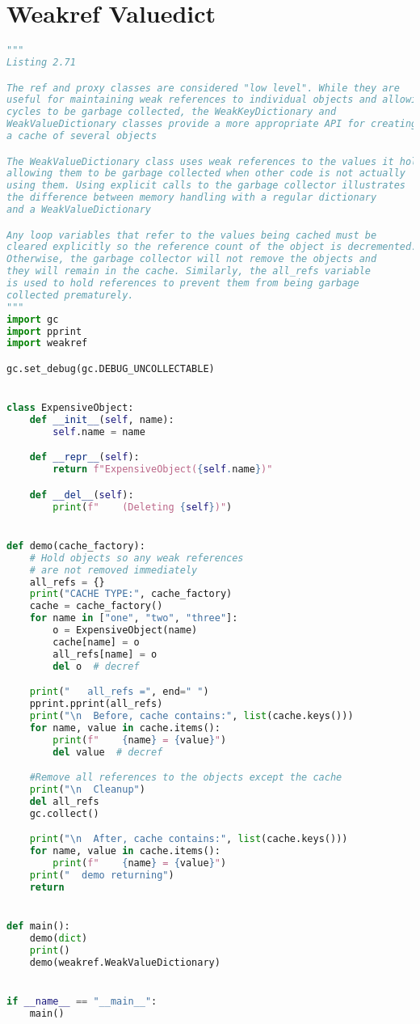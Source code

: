 \documentclass[a4paper,landscape]{report}
\begin{document}
\section{Weakref Valuedict}
\begin{lstlisting}[language=Python]
"""
Listing 2.71

The ref and proxy classes are considered "low level". While they are
useful for maintaining weak references to individual objects and allowing
cycles to be garbage collected, the WeakKeyDictionary and
WeakValueDictionary classes provide a more appropriate API for creating
a cache of several objects

The WeakValueDictionary class uses weak references to the values it holds,
allowing them to be garbage collected when other code is not actually
using them. Using explicit calls to the garbage collector illustrates
the difference between memory handling with a regular dictionary
and a WeakValueDictionary

Any loop variables that refer to the values being cached must be
cleared explicitly so the reference count of the object is decremented.
Otherwise, the garbage collector will not remove the objects and
they will remain in the cache. Similarly, the all_refs variable
is used to hold references to prevent them from being garbage
collected prematurely.
"""
import gc
import pprint
import weakref

gc.set_debug(gc.DEBUG_UNCOLLECTABLE)


class ExpensiveObject:
    def __init__(self, name):
        self.name = name

    def __repr__(self):
        return f"ExpensiveObject({self.name})"

    def __del__(self):
        print(f"    (Deleting {self})")


def demo(cache_factory):
    # Hold objects so any weak references
    # are not removed immediately
    all_refs = {}
    print("CACHE TYPE:", cache_factory)
    cache = cache_factory()
    for name in ["one", "two", "three"]:
        o = ExpensiveObject(name)
        cache[name] = o
        all_refs[name] = o
        del o  # decref

    print("   all_refs =", end=" ")
    pprint.pprint(all_refs)
    print("\n  Before, cache contains:", list(cache.keys()))
    for name, value in cache.items():
        print(f"    {name} = {value}")
        del value  # decref

    #Remove all references to the objects except the cache
    print("\n  Cleanup")
    del all_refs
    gc.collect()

    print("\n  After, cache contains:", list(cache.keys()))
    for name, value in cache.items():
        print(f"    {name} = {value}")
    print("  demo returning")
    return


def main():
    demo(dict)
    print()
    demo(weakref.WeakValueDictionary)


if __name__ == "__main__":
    main()

\end{lstlisting}
\end{document}
